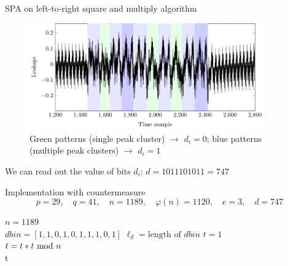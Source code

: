\begin{frame}{SPA on left-to-right square and multiply algorithm}
    \begin{figure}[H]
    \centering
    \includegraphics[width=0.9\textwidth]{fig/SPA_on_RSA_highlighted_peaks.pdf}
    \caption{Green patterns (single peak cluster) $\rightarrow$ $d_i=0$; blue patterns (multiple peak clusters) $\rightarrow$ $d_i=1$}
\end{figure}
We can read out the value of bits $d_i$: $d=1011101011=747$
\end{frame}

\begin{frame}{Implementation with countermeasure}
\[
        p=29,\quad q=41,\quad n=1189,\quad \varphi(n)=1120,\quad e=3,\quad d=747
        \]
{\small
    \begin{algorithm}[H]
$n=1189$\\
$dbin=[1,1,0,1,0,1,1,1,0,1]$
$\ell_d=\text{length of }dbin$
$t = 1$\\
 	{
  	$t=t*t\textrm{~mod~} n$\label{line:alg:SCA-RSA-implementation-counter:tt}\\
  	}
  	\Return t
\caption{
Left-to-right square and multiply-always algorithm.}
\end{algorithm}}
\end{frame}

